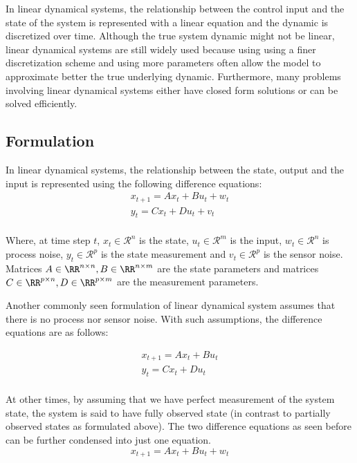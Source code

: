 \documentclass{article}[12pt]
\begin{document}
In linear dynamical systems, the relationship between the control input and the state of the system is represented with a linear equation and the dynamic is discretized over time. Although the true system dynamic might not be linear, linear dynamical systems are still widely used because using using a finer discretization scheme and using more parameters often allow the model to approximate better the true underlying dynamic. Furthermore, many problems involving linear dynamical systems either have closed form solutions or can be solved efficiently.

\subsection{Formulation}

In linear dynamical systems, the relationship between the state, output and the input is represented using the following difference equations:
\begin{equation}
    \begin{aligned}
    x_{t+1} = Ax_t + Bu_t + w_t\\
    y_{t} = Cx_t + Du_t + v_t\\
\end{aligned}
\label{eq:linear-dynamic}
\end{equation}


Where, at time step $t$, $x_t \in \mathcal{R}^{n}$ is the state, $u_t\in \mathcal{R}^m$ is the input, $w_t \in \mathcal{R}^n$ is process noise, $y_t \in \mathcal{R}^p$ is the state measurement and $v_t \in \mathcal{R}^p$ is the sensor noise. Matrices $A \in \RR^{n\times n}, B \in \RR^{n\times m}$ are the state parameters and matrices $C \in \RR^{p\times n}, D\in \RR^{p\times m}$ are the measurement parameters. 

Another commonly seen formulation of linear dynamical system assumes that there is no process nor sensor noise. With such assumptions, the difference equations are as follows:

\begin{equation}
  \begin{aligned}
    x_{t+1} = Ax_t + Bu_t\\
    y_{t} = Cx_t + Du_t\\
\end{aligned}
\label{eq:linear-dynamic-noiseless}
\end{equation}

At other times, by assuming that we have perfect measurement of the system state, the system is said to have fully observed state (in contrast to partially observed states as formulated above). The two difference equations as seen before can be further condensed into just one equation. 
\begin{equation}
    x_{t+1} = Ax_t + Bu_t + w_t\label{eq:linear-dynamic-condensed}
\end{equation}
\end{document}
